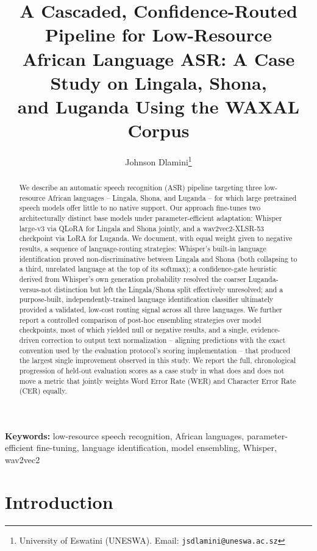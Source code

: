 \documentclass[11pt]{article}
\title{A Cascaded, Confidence-Routed Pipeline for Low-Resource\\
African Language ASR: A Case Study on Lingala, Shona,\\
and Luganda Using the WAXAL Corpus}
\author{Johnson Dlamini\thanks{University of Eswatini (UNESWA). Email: \texttt{jsdlamini@uneswa.ac.sz}}}
\date{}
\begin{document}
\maketitle

\begin{abstract}
We describe an automatic speech recognition (ASR) pipeline targeting three low-resource African languages -- Lingala, Shona, and Luganda -- for which large pretrained speech models offer little to no native support. Our approach fine-tunes two architecturally distinct base models under parameter-efficient adaptation: Whisper large-v3 via QLoRA for Lingala and Shona jointly, and a wav2vec2-XLSR-53 checkpoint via LoRA for Luganda. We document, with equal weight given to negative results, a sequence of language-routing strategies: Whisper's built-in language identification proved non-discriminative between Lingala and Shona (both collapsing to a third, unrelated language at the top of its softmax); a confidence-gate heuristic derived from Whisper's own generation probability resolved the coarser Luganda-versus-not distinction but left the Lingala/Shona split effectively unresolved; and a purpose-built, independently-trained language identification classifier ultimately provided a validated, low-cost routing signal across all three languages. We further report a controlled comparison of post-hoc ensembling strategies over model checkpoints, most of which yielded null or negative results, and a single, evidence-driven correction to output text normalization -- aligning predictions with the exact convention used by the evaluation protocol's scoring implementation -- that produced the largest single improvement observed in this study. We report the full, chronological progression of held-out evaluation scores as a case study in what does and does not move a metric that jointly weights Word Error Rate (WER) and Character Error Rate (CER) equally.
\end{abstract}

\noindent\textbf{Keywords:} low-resource speech recognition, African languages, parameter-efficient fine-tuning, language identification, model ensembling, Whisper, wav2vec2

\section{Introduction}
\end{document}
